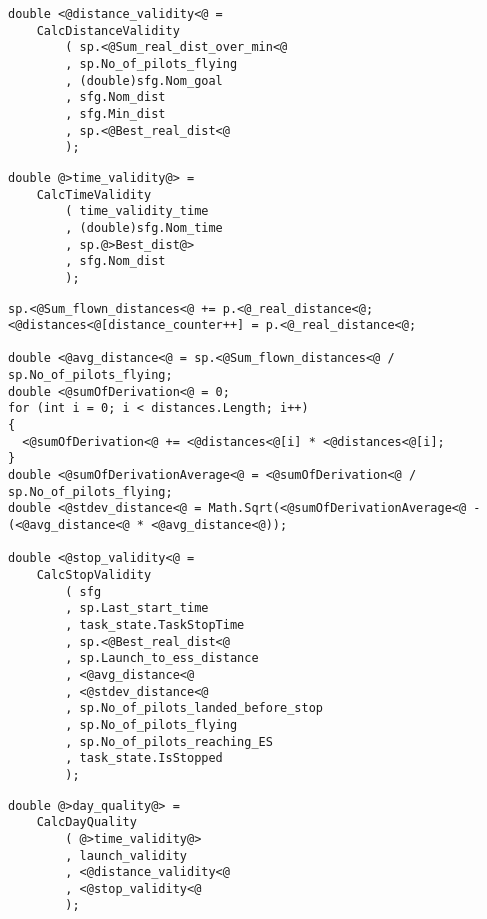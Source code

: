 \documentclass[gap.tex]{subfiles}
\begin{document}
\begin{lstlisting}[style=base, caption={Distance validity depends on \textcolor{blue}{real} distance inputs.}]
double <@distance_validity<@ =
    CalcDistanceValidity
        ( sp.<@Sum_real_dist_over_min<@
        , sp.No_of_pilots_flying
        , (double)sfg.Nom_goal
        , sfg.Nom_dist
        , sfg.Min_dist
        , sp.<@Best_real_dist<@
        );
\end{lstlisting}

\begin{lstlisting}[style=base, caption={Time validity depends on \textcolor{red}{bonus} distance input.}]
double @>time_validity@> =
    CalcTimeValidity
        ( time_validity_time
        , (double)sfg.Nom_time
        , sp.@>Best_dist@>
        , sfg.Nom_dist
        );
\end{lstlisting}

\begin{lstlisting}[style=base, caption={Stop validity depends on \textcolor{blue}{real} distance inputs.}]
sp.<@Sum_flown_distances<@ += p.<@_real_distance<@;
<@distances<@[distance_counter++] = p.<@_real_distance<@;

double <@avg_distance<@ = sp.<@Sum_flown_distances<@ / sp.No_of_pilots_flying;
double <@sumOfDerivation<@ = 0;
for (int i = 0; i < distances.Length; i++)
{
  <@sumOfDerivation<@ += <@distances<@[i] * <@distances<@[i];
}
double <@sumOfDerivationAverage<@ = <@sumOfDerivation<@ / sp.No_of_pilots_flying;
double <@stdev_distance<@ = Math.Sqrt(<@sumOfDerivationAverage<@ - (<@avg_distance<@ * <@avg_distance<@));

double <@stop_validity<@ =
    CalcStopValidity
        ( sfg
        , sp.Last_start_time
        , task_state.TaskStopTime
        , sp.<@Best_real_dist<@
        , sp.Launch_to_ess_distance
        , <@avg_distance<@
        , <@stdev_distance<@
        , sp.No_of_pilots_landed_before_stop
        , sp.No_of_pilots_flying
        , sp.No_of_pilots_reaching_ES
        , task_state.IsStopped
        );
\end{lstlisting}

\begin{lstlisting}[style=base, caption={Task validity depends on \textcolor{red}{bonus} distance (and \textcolor{blue}{real} distance).}]
double @>day_quality@> =
    CalcDayQuality
        ( @>time_validity@>
        , launch_validity
        , <@distance_validity<@
        , <@stop_validity<@
        );
\end{lstlisting}
\end{document}
